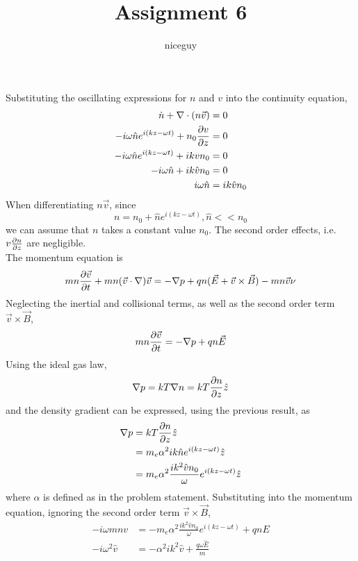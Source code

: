 \documentclass[answers]{exam}
\title{Assignment 6}
\author{niceguy}
\begin{document}
\maketitle

\begin{questions}

\question{}

\begin{solution}
    Substituting the oscillating expressions for $n$ and $v$ into the continuity equation,
    \begin{align*}
        \dot n + \nabla \cdot (n\vec v) &= 0 \\
        -i\omega \hat n e^{i(kz - \omega t)} + n_0\frac{\partial v}{\partial z} &= 0 \\
        -i\omega \hat n e^{i(kz - \omega t)} + ikvn_0 &= 0 \\
        -i\omega \hat n + ik\hat vn_0 &= 0 \\
        i\omega \hat n &= ik\hat vn_0
    \end{align*}
    When differentiating $n\vec v$, since
    $$n = n_0 + \hat n e^{i(kz - \omega t)}, \hat n << n_0$$
    we can assume that $n$ takes a constant value $n_0$. The second order effects, i.e. $v\frac{\partial n}{\partial z}$ are negligible. \\
    The momentum equation is
    $$mn\frac{\partial \vec v}{\partial t} + mn(\vec v \cdot \nabla)\vec v = -\nabla p + qn(\vec E + \vec v \times \vec B) - mn\vec v\nu$$
    Neglecting the inertial and collisional terms, as well as the second order term $\vec v \times \vec B$,
    $$mn\frac{\partial \vec v}{\partial t} = -\nabla p + qn\vec E$$
    Using the ideal gas law,
    $$\nabla p = kT \nabla n = kT \frac{\partial n}{\partial z}\hat z$$
    and the density gradient can be expressed, using the previous result, as
    \begin{align*}
        \nabla p &= kT \frac{\partial n}{\partial z}\hat z \\
                 &= m_e\alpha^2 ik\hat n e^{i(kz-\omega t)} \hat z \\
                 &= m_e\alpha^2 \frac{ik^2\hat vn_0}{\omega} e^{i(kz-\omega t)} \hat z
    \end{align*}
    where $\alpha$ is defined as in the problem statement. Substituting into the momentum equation, ignoring the second order term $\vec v \times \vec B$,
    \begin{align*}
        -i\omega mnv &= -m_e\alpha^2 \frac{ik^2\hat vn_0}{\omega} e^{i(kz-\omega t)} + qnE \\
        -i\omega^2\hat v &= -\alpha^2 ik^2\hat v + \frac{q\omega \hat E}{m} \\

\end{align*}
\end{solution}
\end{questions}
\end{document}
